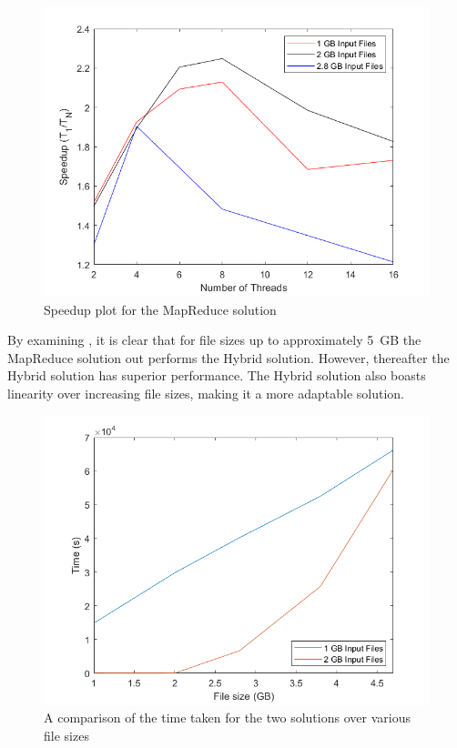 \documentclass[12pt,twocolumn]{witseiepaper}
\begin{document}
\begin{figure}[h]
	\centering
	\includegraphics[width=1\columnwidth]{mapReduceSpeedup.png}
	\caption{Speedup plot for the MapReduce solution}
	\raggedright
	\label{fig:speedUpMR}	
\end{figure}

By examining , it is clear that for file sizes up to approximately 5~GB the MapReduce solution out performs the Hybrid solution. However, thereafter the Hybrid solution has superior performance. The Hybrid solution also boasts linearity over increasing file sizes, making it a more adaptable solution.

\begin{figure}[h]
	\centering
	\includegraphics[width=1\columnwidth]{comparison.png}
	\caption{A comparison of the time taken for the two solutions over various file sizes}
	\raggedright
	\label{fig:comparison}	
\end{figure}
\end{document}
